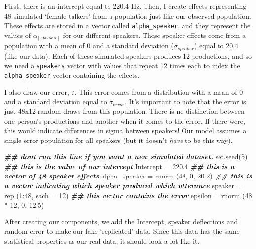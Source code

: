 \documentclass[
]{book}
\newenvironment{Shaded}{\begin{snugshade}}{\end{snugshade}}
\newcommand{\AttributeTok}[1]{\textcolor[rgb]{0.77,0.63,0.00}{#1}}
\newcommand{\DecValTok}[1]{\textcolor[rgb]{0.00,0.00,0.81}{#1}}
\newcommand{\DocumentationTok}[1]{\textcolor[rgb]{0.56,0.35,0.01}{\textbf{\textit{#1}}}}
\newcommand{\FloatTok}[1]{\textcolor[rgb]{0.00,0.00,0.81}{#1}}
\newcommand{\FunctionTok}[1]{\textcolor[rgb]{0.00,0.00,0.00}{#1}}
\newcommand{\NormalTok}[1]{#1}
\newcommand{\OtherTok}[1]{\textcolor[rgb]{0.56,0.35,0.01}{#1}}
\newcommand{\SpecialCharTok}[1]{\textcolor[rgb]{0.00,0.00,0.00}{#1}}
\begin{document}
First, there is an intercept equal to 220.4 Hz. Then, I create effects representing 48 simulated `female talkers' from a population just like our observed population. These effects are stored in a vector called \texttt{alpha\_speaker}, and they represent the values of \(\alpha_{[speaker]}\) for our different speakers. These speaker effects come from a population with a mean of 0 and a standard deviation (\(\sigma_{speaker}\)) equal to 20.4 (like our data). Each of these simulated speakers produces 12 productions, and so we need a \texttt{speakers} vector with values that repeat 12 times each to index the \texttt{alpha\_speaker} vector containing the effects.

I also draw our error, \(\varepsilon\). This error comes from a distribution with a mean of 0 and a standard deviation equal to \(\sigma_{error}\). It's important to note that the error is just 48x12 random draws from this population. There is no distinction between one person's productions and another when it comes to the error. If there were, this would indicate differences in sigma between speakers! Our model assumes a single error population for all speakers (but it doesn't \emph{have} to be this way).

\begin{Shaded}
\begin{Highlighting}[]
\DocumentationTok{\#\# don\textquotesingle{}t run this line if you want a new simulated dataset. }
\FunctionTok{set.seed}\NormalTok{(}\DecValTok{5}\NormalTok{)}
\DocumentationTok{\#\# this is the value of our intercept}
\NormalTok{Intercept }\OtherTok{=} \FloatTok{220.4}
\DocumentationTok{\#\# this is a vector of 48 speaker effects}
\NormalTok{alpha\_speaker }\OtherTok{=} \FunctionTok{rnorm}\NormalTok{ (}\DecValTok{48}\NormalTok{, }\DecValTok{0}\NormalTok{, }\FloatTok{20.2}\NormalTok{)}
\DocumentationTok{\#\# this is a vector indicating which speaker produced which utterance}
\NormalTok{speaker }\OtherTok{=} \FunctionTok{rep}\NormalTok{ (}\DecValTok{1}\SpecialCharTok{:}\DecValTok{48}\NormalTok{, }\AttributeTok{each =} \DecValTok{12}\NormalTok{)}
\DocumentationTok{\#\# this vector contains the error}
\NormalTok{epsilon }\OtherTok{=} \FunctionTok{rnorm}\NormalTok{ (}\DecValTok{48} \SpecialCharTok{*} \DecValTok{12}\NormalTok{, }\DecValTok{0}\NormalTok{, }\FloatTok{12.5}\NormalTok{)}
\end{Highlighting}
\end{Shaded}

After creating our components, we add the Intercept, speaker deflections and random error to make our fake `replicated' data. Since this data has the same statistical properties as our real data, it should look a lot like it.
\end{document}
